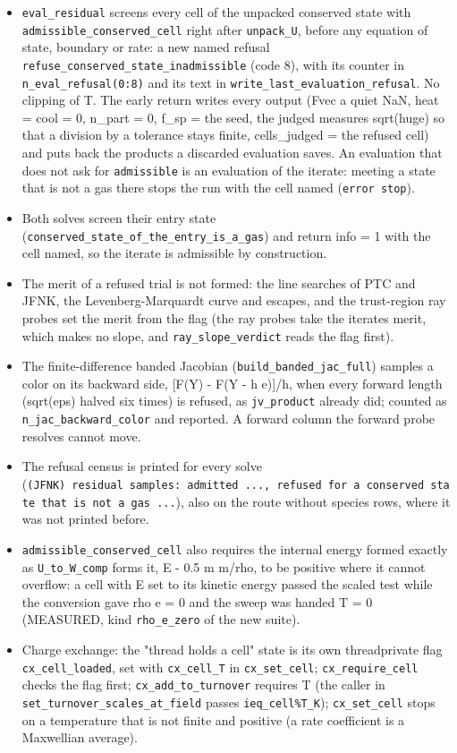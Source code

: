 \documentclass[english,a4paper]{my_memo}
\providecommand{\tightlist}{\setlength{\itemsep}{0pt}\setlength{\parskip}{0pt}}
\begin{document}
\begin{itemize}
\tightlist
\item
  \texttt{eval\_residual} screens every cell of the unpacked conserved state with \texttt{admissible\_conserved\_cell} right after \texttt{unpack\_U}, before any equation of state, boundary or rate: a new named refusal \texttt{refuse\_conserved\_state\_inadmissible} (code 8), with its counter in \texttt{n\_eval\_refusal(0:8)} and its text in \texttt{write\_last\_evaluation\_refusal}. No clipping of T. The early return writes every output (Fvec a quiet NaN, heat = cool = 0, n\_part = 0, f\_sp = the seed, the judged measures sqrt(huge) so that a division by a tolerance stays finite, cells\_judged = the refused cell) and puts back the products a discarded evaluation saves. An evaluation that does not ask for \texttt{admissible} is an evaluation of the iterate: meeting a state that is not a gas there stops the run with the cell named (\texttt{error\ stop}).
\item
  Both solves screen their entry state (\texttt{conserved\_state\_of\_the\_entry\_is\_a\_gas}) and return info = 1 with the cell named, so the iterate is admissible by construction.
\item
  The merit of a refused trial is not formed: the line searches of PTC and JFNK, the Levenberg-Marquardt curve and escapes, and the trust-region ray probes set the merit from the flag (the ray probes take the iterate\textquotesingle s merit, which makes no slope, and \texttt{ray\_slope\_verdict} reads the flag first).
\item
  The finite-difference banded Jacobian (\texttt{build\_banded\_jac\_full}) samples a color on its backward side, {[}F(Y) - F(Y - h e){]}/h, when every forward length (sqrt(eps) halved six times) is refused, as \texttt{jv\_product} already did; counted as \texttt{n\_jac\_backward\_color} and reported. A forward column the forward probe resolves cannot move.
\item
  The refusal census is printed for every solve (\texttt{(JFNK)\ residual\ samples:\ admitted\ ...,\ refused\ for\ a\ conserved\ state\ that\ is\ not\ a\ gas\ ...}), also on the route without species rows, where it was not printed before.
\item
  \texttt{admissible\_conserved\_cell} also requires the internal energy formed exactly as \texttt{U\_to\_W\_comp} forms it, E - 0.5 m m/rho, to be positive where it cannot overflow: a cell with E set to its kinetic energy passed the scaled test while the conversion gave rho e = 0 and the sweep was handed T = 0 (MEASURED, kind \texttt{rho\_e\_zero} of the new suite).
\item
  Charge exchange: the "thread holds a cell" state is its own threadprivate flag \texttt{cx\_cell\_loaded}, set with \texttt{cx\_cell\_T} in \texttt{cx\_set\_cell}; \texttt{cx\_require\_cell} checks the flag first; \texttt{cx\_add\_to\_turnover} requires T (the caller in \texttt{set\_turnover\_scales\_at\_field} passes \texttt{ieq\_cell\%T\_K}); \texttt{cx\_set\_cell} stops on a temperature that is not finite and positive (a rate coefficient is a Maxwellian average).
\end{itemize}
\end{document}
